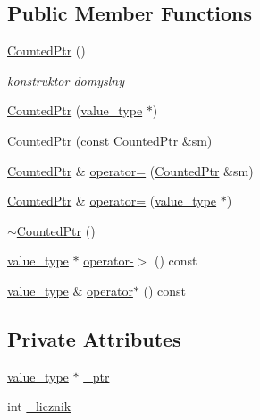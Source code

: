 \subsection*{\-Public \-Member \-Functions}
\begin{DoxyCompactItemize}
\item 
\hyperlink{classOOP_1_1CountedPtr_ae4ac1ddad6538a7281548fd57f5ce158}{\-Counted\-Ptr} ()
\begin{DoxyCompactList}\small\item\em konstruktor domyslny \end{DoxyCompactList}\item 
\hyperlink{classOOP_1_1CountedPtr_a9e67f7da194834072589bca1dce8ccd1}{\-Counted\-Ptr} (\hyperlink{namespaceOOP_a98bf9fa44d8f36499284c9d57c1958aa}{value\-\_\-type} $\ast$)
\item 
\hyperlink{classOOP_1_1CountedPtr_ac5c681d51cd855f36324c467a815618e}{\-Counted\-Ptr} (const \hyperlink{classOOP_1_1CountedPtr}{\-Counted\-Ptr} \&sm)
\item 
\hyperlink{classOOP_1_1CountedPtr}{\-Counted\-Ptr} \& \hyperlink{classOOP_1_1CountedPtr_a36dcaf2d0c344daccdee0a4a51f78728}{operator=} (\hyperlink{classOOP_1_1CountedPtr}{\-Counted\-Ptr} \&sm)
\item 
\hyperlink{classOOP_1_1CountedPtr}{\-Counted\-Ptr} \& \hyperlink{classOOP_1_1CountedPtr_af0a02d043048c2320399f8da522b7d83}{operator=} (\hyperlink{namespaceOOP_a98bf9fa44d8f36499284c9d57c1958aa}{value\-\_\-type} $\ast$)
\item 
\hyperlink{classOOP_1_1CountedPtr_ac4722fd3d5938a1527492acfe4a65a8c}{$\sim$\-Counted\-Ptr} ()
\item 
\hyperlink{namespaceOOP_a98bf9fa44d8f36499284c9d57c1958aa}{value\-\_\-type} $\ast$ \hyperlink{classOOP_1_1CountedPtr_ab2b2a4dc75829686c60fff3194da9cb9}{operator-\/$>$} () const 
\item 
\hyperlink{namespaceOOP_a98bf9fa44d8f36499284c9d57c1958aa}{value\-\_\-type} \& \hyperlink{classOOP_1_1CountedPtr_a2c840594d489eb2f7016e5da227f95e2}{operator$\ast$} () const 
\end{DoxyCompactItemize}
\subsection*{\-Private \-Attributes}
\begin{DoxyCompactItemize}
\item 
\hyperlink{namespaceOOP_a98bf9fa44d8f36499284c9d57c1958aa}{value\-\_\-type} $\ast$ \hyperlink{classOOP_1_1CountedPtr_a2bd5db7ffc59b7811e484c3e858950bd}{\-\_\-ptr}
\item 
int \hyperlink{classOOP_1_1CountedPtr_af164c5e11320b91ea4744fe23c6c3d5b}{\-\_\-licznik}
\end{DoxyCompactItemize}
